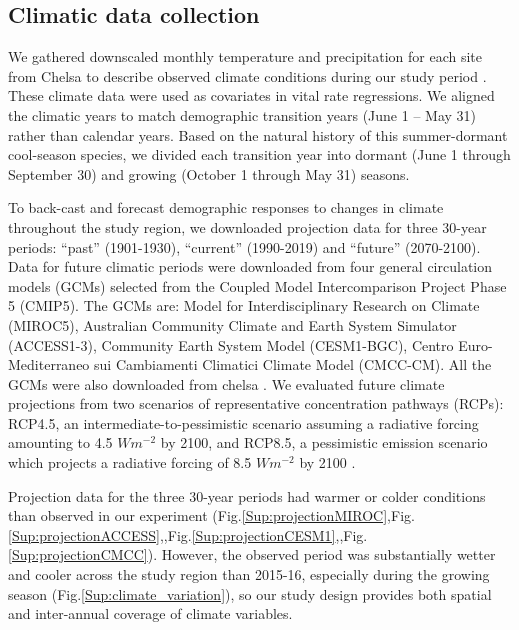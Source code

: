 \documentclass[12pt]{article}
\begin{document}
\subsection*{Climatic data collection}
We gathered downscaled monthly temperature and precipitation for each site from Chelsa to describe observed climate conditions during our study period \citep{karger2017climatologies}.
These climate data were used as covariates in vital rate regressions. 
We aligned the climatic years to match demographic transition years (June 1 -- May 31) rather than calendar years.
Based on the natural history of this summer-dormant cool-season species, we divided each transition year into dormant (June 1 through September 30) and growing (October 1 through May 31) seasons. 

To back-cast and forecast demographic responses to changes in climate throughout the study region, we downloaded projection data for three 30-year periods: ``past'' (1901-1930), ``current'' (1990-2019) and ``future'' (2070-2100).
Data for future climatic periods were downloaded from four general circulation models (GCMs) selected from the Coupled Model Intercomparison Project Phase 5 (CMIP5). 
The GCMs are: Model for Interdisciplinary Research on Climate (MIROC5), Australian Community Climate and Earth System Simulator (ACCESS1-3), Community Earth System Model (CESM1-BGC), Centro Euro-Mediterraneo sui Cambiamenti Climatici Climate Model (CMCC-CM).
All the GCMs were also downloaded from chelsa \citep{sanderson2015representative}.
We evaluated future climate projections from two scenarios of representative concentration pathways (RCPs): RCP4.5, an intermediate-to-pessimistic scenario assuming a radiative forcing amounting to 4.5 $W m^{-2}$ by 2100, and RCP8.5, a pessimistic emission scenario which projects a radiative forcing of 8.5 $W m^{-2}$ by 2100 \citep{thomson2011rcp4, schwalm2020rcp8}. 

Projection data for the three 30-year periods had warmer or colder conditions than observed in our experiment (Fig.\ref{Sup:projectionMIROC},Fig.\ref{Sup:projectionACCESS},,Fig.\ref{Sup:projectionCESM1},,Fig.\ref{Sup:projectionCMCC}). 
However, the observed period was substantially wetter and cooler across the study region than 2015-16, especially during the growing season (Fig.\ref{Sup:climate_variation}), so our study design provides both spatial and inter-annual coverage of climate variables. 
\end{document}
